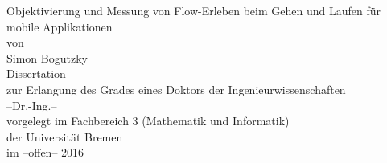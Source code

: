 \begin{titlepage}
\begin{singlespace}
\begin{center}
\Huge Objektivierung und Messung von Flow-Erleben beim Gehen und Laufen für mobile Applikationen\\
\vspace{15mm}
\normalsize von\\
\normalsize Simon Bogutzky\\
\vspace{30mm}
\normalsize Dissertation\\
\normalsize zur Erlangung des Grades eines Doktors der Ingenieurwissenschaften\\
\normalsize  --Dr.-Ing.--\\
\vspace{80mm}
\normalsize vorgelegt im Fachbereich 3 (Mathematik und Informatik)\\
\normalsize der Universität Bremen\\
\normalsize im --offen-- 2016\\
\end{center}
\end{singlespace}
\end{titlepage}